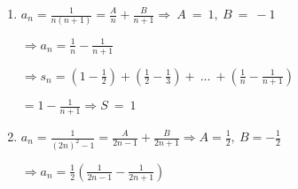 \documentclass[11pt]{amsbook}
\begin{document}
\begin{enumerate}[label=(\alph*)]
	
	\item $a_{n}=\frac{1}{n(n+1)}=\frac{A}{n}+\frac{B}{n+1}\Longrightarrow\ A\ =\ 1,\ B\ =\ -1$\par
	$\Longrightarrow a_{n}=\frac{1}{n}-\frac{1}{n+1}$\par
	$\Longrightarrow s_{n}=(1-\frac{1}{2})+(\frac{1}{2}-\frac{1}{3})+\ ...\ +(\frac{1}{n}-\frac{1}{n+1})$\par
	$=1-\frac{1}{n+1}\Longrightarrow S\ =\ 1$
	
	\item $a_{n}=\frac{1}{(2n)^{2}-1}=\frac{A}{2n-1}+\frac{B}{2n+1}\Longrightarrow A=\frac{1}{2},\ B = -\frac{1}{2}$\par
	$\Longrightarrow a_{n}=\frac{1}{2}(\frac{1}{2n-1}-\frac{1}{2n+1})$

\end{enumerate}



\end{document}
